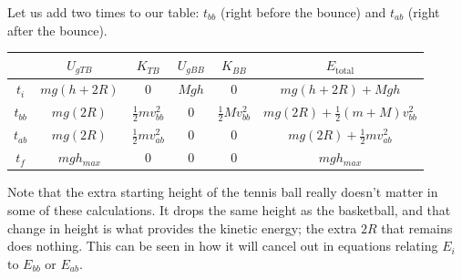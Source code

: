 \documentclass[]{article}
\begin{document}
\begin{TeacherMargin}
\noindent Let us add two times to our table: $t_{bb}$ (right before the bounce) and $t_{ab}$ (right after the bounce).
\begin{center}
\begin{tabular}{c||c|c|c|c||c}
	& $U_{gTB}$ & $K_{TB}$ & $U_{gBB}$ & $K_{BB}$ & $E_{\text{total}}$ \\ \hline
	$t_{i}$ & $mg(h+2R)$ & $0$ & $Mgh$ & $0$ & $mg(h+2R)+Mgh$ \\ \hline
	$t_{bb}$ & $mg(2R)$ & $\frac{1}{2}mv_{bb}^{2}$ & $0$ & $\frac{1}{2}Mv_{bb}^{2}$ & $mg(2R) + \frac{1}{2}(m+M)v_{bb}^{2}$ \\ \hline
	$t_{ab}$ & $mg(2R)$ & $\frac{1}{2}mv_{ab}^{2}$ & $0$ & $0$ & $mg(2R) + \frac{1}{2}mv_{ab}^{2}$ \\ \hline
	$t_{f}$ & $mgh_{max}$ & $0$ & $0$ & $0$ & $mgh_{max}$
\end{tabular}
\end{center}
Note that the extra starting height of the tennis ball really doesn't matter in some of these calculations. It drops the same height as the basketball, and that change in height is what provides the kinetic energy; the extra $2R$ that remains does nothing. This can be seen in how it will cancel out in equations relating $E_{i}$ to $E_{bb}$ or $E_{ab}$. \\


\end{TeacherMargin}
\end{document}
